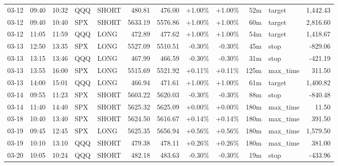 \documentclass[11pt,a4paper,twoside]{article}
\begin{document}
\begin{center}
\begin{longtable}{>{\color{txtmain}}l l l l l r r r r r >{\color{txtmain}}l r}
03-12 & 09:40 & 10:32 & QQQ & SHORT & 480.81 & 476.00 & \textcolor{wingreen}{+1.00\%} & \textcolor{wingreen}{+1.00\%} & 52m & target & \textcolor{wingreen}{1,442.43} \\
03-12 & 09:40 & 10:40 & SPX & SHORT & 5633.19 & 5576.86 & \textcolor{wingreen}{+1.00\%} & \textcolor{wingreen}{+1.00\%} & 60m & target & \textcolor{wingreen}{2,816.60} \\
03-12 & 11:05 & 11:59 & QQQ & LONG & 472.89 & 477.62 & \textcolor{wingreen}{+1.00\%} & \textcolor{wingreen}{+1.00\%} & 54m & target & \textcolor{wingreen}{1,418.67} \\
03-13 & 12:50 & 13:35 & SPX & LONG & 5527.09 & 5510.51 & \textcolor{lossred}{-0.30\%} & \textcolor{lossred}{-0.30\%} & 45m & stop & \textcolor{lossred}{-829.06} \\
03-13 & 13:15 & 13:46 & QQQ & LONG & 467.99 & 466.59 & \textcolor{lossred}{-0.30\%} & \textcolor{lossred}{-0.30\%} & 31m & stop & \textcolor{lossred}{-421.19} \\
03-13 & 13:55 & 16:00 & SPX & LONG & 5515.69 & 5521.92 & \textcolor{wingreen}{+0.11\%} & \textcolor{wingreen}{+0.11\%} & 125m & max\_time & \textcolor{wingreen}{311.50} \\
03-13 & 14:00 & 15:01 & QQQ & LONG & 466.94 & 471.61 & \textcolor{wingreen}{+1.00\%} & \textcolor{wingreen}{+1.00\%} & 61m & target & \textcolor{wingreen}{1,400.82} \\
03-14 & 09:55 & 11:23 & SPX & SHORT & 5603.22 & 5620.03 & \textcolor{lossred}{-0.30\%} & \textcolor{lossred}{-0.30\%} & 88m & stop & \textcolor{lossred}{-840.48} \\
03-14 & 11:40 & 14:40 & SPX & SHORT & 5625.32 & 5625.09 & \textcolor{wingreen}{+0.00\%} & \textcolor{wingreen}{+0.00\%} & 180m & max\_time & \textcolor{wingreen}{11.50} \\
03-18 & 10:40 & 13:40 & SPX & SHORT & 5624.50 & 5616.67 & \textcolor{wingreen}{+0.14\%} & \textcolor{wingreen}{+0.14\%} & 180m & max\_time & \textcolor{wingreen}{391.50} \\
03-19 & 09:45 & 12:45 & SPX & LONG & 5625.35 & 5656.94 & \textcolor{wingreen}{+0.56\%} & \textcolor{wingreen}{+0.56\%} & 180m & max\_time & \textcolor{wingreen}{1,579.50} \\
03-19 & 10:10 & 13:10 & QQQ & SHORT & 479.38 & 478.11 & \textcolor{wingreen}{+0.26\%} & \textcolor{wingreen}{+0.26\%} & 180m & max\_time & \textcolor{wingreen}{381.00} \\
03-20 & 10:05 & 10:24 & QQQ & SHORT & 482.18 & 483.63 & \textcolor{lossred}{-0.30\%} & \textcolor{lossred}{-0.30\%} & 19m & stop & \textcolor{lossred}{-433.96} \\

\end{longtable}
\end{center}
\end{document}
